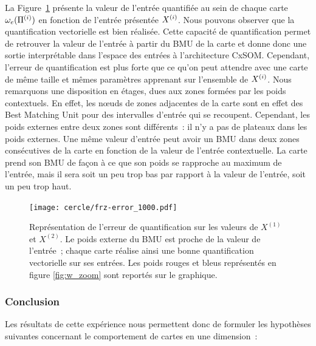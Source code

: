 \documentclass[../main]{subfiles}
\begin{document}
La Figure~\ref{fig:qv} présente la valeur de l'entrée quantifiée au sein de chaque carte $\omega_{e}(\Pi^{({i})})$ en fonction de l'entrée présentée $X^{({i})}$. 
Nous pouvons observer que la quantification vectorielle est bien réalisée. Cette capacité de quantification permet de retrouver la valeur de l'entrée à partir du BMU de la carte et donne donc une sortie interprétable dans l'espace des entrées à l'architecture CxSOM.
Cependant, l'erreur de quantification est plus forte que ce qu'on peut attendre avec une carte de même taille et mêmes paramètres apprenant sur l'ensemble de $X^{({i})}$. Nous remarquons une disposition en étages, dues aux zones formées par les poids contextuels.
En effet, les n\oe{}uds de zones adjacentes de la carte sont en effet des Best Matching Unit pour des intervalles d'entrée qui se recoupent. Cependant, les poids externes entre deux zones sont différents~: il n'y a pas de plateaux dans les poids externes. Une même valeur d'entrée peut avoir un BMU dans deux zones consécutives de la carte en fonction de la valeur de l'entrée contextuelle. La carte prend son BMU de façon à ce que son poids se rapproche au maximum de l'entrée, mais il sera soit un peu trop bas par rapport à la valeur de l'entrée, soit un peu trop haut.

\begin{figure}
	\centering\texttt{[image: cercle/frz-error\_1000.pdf]}
	\caption{Représentation de l'erreur de quantification sur les valeurs de $X^{(1)}$ et $X^{(2)}$. Le poids externe du BMU est proche de la valeur de l'entrée~; chaque carte réalise ainsi une bonne quantification vectorielle sur ses entrées. 
	Les poids rouges et bleus représentés en figure \ref{fig:w_zoom} sont reportés sur le graphique. \label{fig:qv}}
\end{figure}

\subsubsection{Conclusion}

Les résultats de cette expérience nous permettent donc de formuler les hypothèses suivantes concernant le comportement de cartes en une dimension~:
\end{document}
